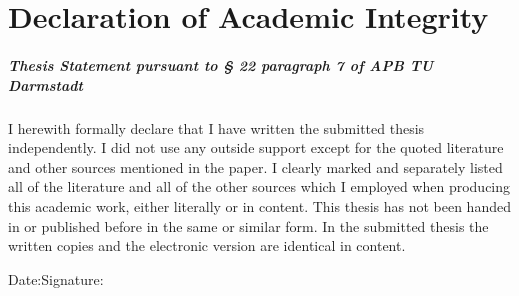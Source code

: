 	\chapter*{Declaration of Academic Integrity}
	\vspace{11pt}
	\paragraph{Thesis Statement pursuant to § 22 paragraph 7 of APB TU Darmstadt}
	\vspace{11pt}
	\noindent I herewith formally declare that I have written the submitted thesis independently. I did not use any outside support except for the quoted literature and other sources mentioned in the paper. I clearly marked and separately listed all of the literature and all of the other sources which I employed when producing this academic work, either literally or in content. This thesis has not been handed in or published before in the same or similar form.\newline
	In the submitted thesis the written copies and the electronic version are identical in content.\vspace{40pt}
	
	\noindent Date:\hspace{0.4\textwidth}Signature:
	\vspace*{2cm}